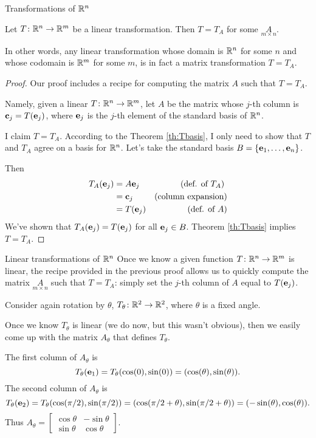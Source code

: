 \begin{frame}{Transformations of ${\mathbb R}^n$}
\begin{corollary}
Let $T\colon {\mathbb R}^n\rightarrow {\mathbb R}^m$ be a linear transformation. Then $T=T_A$ for some $\underset{m\times n}{A}$. 

In other words, \alert{any} linear transformation whose domain is ${\mathbb R}^n$ for some $n$ and whose codomain is ${\mathbb R}^m$ for some $m$, is in fact a matrix transformation $T=T_A$. 
\end{corollary}
\pause
\begin{proof}
Our proof includes a \alert{recipe} for computing the matrix $A$ such that $T=T_A$. 

Namely, given a linear $T\colon{\mathbb R}^n\rightarrow {\mathbb R}^m$, let $A$ be the matrix whose $j$-th column is ${\mathbf c}_j=T({\mathbf e}_j)$, where ${\mathbf e}_j$ is the $j$-th element of the standard basis of ${\mathbb R}^n$. 

I claim $T=T_A$. 
\bpause
According to the Theorem \ref{th:Tbasis}, I only need to show that $T$ and $T_A$ agree on a basis for ${\mathbb R}^n$. Let's take the standard basis $B=\{{\mathbf e}_1,\dots,{\mathbf e}_n\}$. 

\pause Then 
\begin{align*}
T_A({\mathbf e}_j)&=A{\mathbf e}_j &\text{(def. of $T_A$) }\\
&={\mathbf c}_j &\text{(column expansion)}\\
&=T({\mathbf e}_j) &\text{(def. of $A$)}
\end{align*}
We've shown that $T_A({\mathbf e}_j)=T({\mathbf e}_j)$ for all ${\mathbf e}_j\in B$. Theorem \ref{th:Tbasis} implies $T=T_A$. 
\end{proof}
\end{frame}
\begin{frame}{Linear transformations of ${\mathbb R}^n$}
 Once we know a given function $T\colon {\mathbb R}^n\rightarrow{\mathbb R}^m$ is linear, the recipe provided in the previous proof allows us to quickly compute the matrix $\underset{m\times n}{A}$ such that $T=T_A$: simply set the $j$-th column of $A$ equal to $T({\mathbf e}_j)$. 
 \pause
 \begin{example}
 Consider again rotation by $\theta$, $T_\theta\colon {\mathbb R}^2\rightarrow {\mathbb R}^2$, where $\theta$ is a fixed angle. 
 
 Once we know $T_\theta$ is linear (we do now, but this wasn't obvious), then we easily come up with the matrix $A_\theta$ that defines $T_\theta$. 
 
 \pause
 The \alert{first column} of $A_\theta$ is 
 \[
 T_\theta({\mathbf e}_1)=T_\theta (\cos(0),\sin(0))=(\cos(\theta),\sin(\theta)).\] 
 \pause
 The \alert{second column} of $A_\theta$ is 
 \[
 T_\theta({\mathbf e}_2)=T_\theta (\cos(\pi/2),\sin(\pi/2))=(\cos(\pi/2+\theta),\sin(\pi/2+\theta))=(-\sin(\theta), \cos(\theta)).
 \] 
 Thus $A_\theta=\begin{bmatrix}
 \cos\theta&-\sin\theta \\
 \sin\theta&\cos\theta
 \end{bmatrix}$. 
 
 \end{example} 
 
\end{frame}
